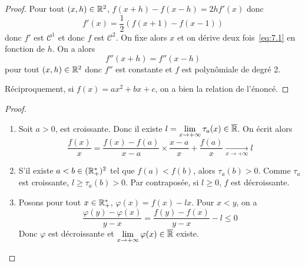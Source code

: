 \begin{proof}
	Pour tout $(x,h)\in\mathbb{R}^{2}$, $f(x+h)-f(x-h)=2hf'(x)$ donc 
	\begin{equation}
		\label{eq:7.1}
		f'(x)=\frac{1}{2}(f(x+1)-f(x-1))
	\end{equation}
	donc $f'$ est $\mathcal{C}^{1}$ et donc $f$ est $\mathcal{C}^{2}$. On fixe alors $x$ et on dérive deux fois~\eqref{eq:7.1} en fonction de $h$. On a alors
	\begin{equation}f''(x+h)=f''(x-h)\end{equation}
	pour tout $(x,h)\in\mathbb{R}^{2}$ donc $f''$ est constante et $f$ est polynômiale de degré 2.

	Réciproquement, si $f(x)=ax^{2}+bx+c$, on a bien la relation de l'énoncé.
\end{proof}

\begin{proof}
	\phantom{}
	\begin{enumerate}
		\item Soit $a>0$, \function{\tau_{a}}{\R}{]a,+\infty[}{x}{\frac{f(x)-f(a)}{x-a}}
		est croissante. Donc il existe $l=\lim\limits_{x\to+\infty}\tau_{a}(x)\in\overline{\mathbb{R}}$. On écrit alors 
		\begin{equation}\frac{f(x)}{x}=\frac{f(x)-f(a)}{x-a}\times \frac{x-a}{x}+\frac{f(a)}{x}\xrightarrow[x\to+\infty]{}l\end{equation}

		\item S'il existe $a<b\in(\mathbb{R}_{+}^{*})^{2}$ tel que $f(a)<f(b)$, alors $\tau_{a}(b)>0$. Comme $\tau_{a}$ est croissante, $l\geqslant\tau_{a}(b)>0$. Par contraposée, si $l\geqslant0$, $f$ est décroissante.
		\item Posons pour tout $x\in\mathbb{R}_{+}^{*}$, $\varphi(x)=f(x)-lx$. Pour $x<y$, on a 
		\begin{equation}\frac{\varphi(y)-\varphi(x)}{y-x}=\frac{f(y)-f(x)}{y-x}-l\leqslant0\end{equation}
		Donc $\varphi$ est décroissante et $\lim\limits_{x\to+\infty}\varphi(x)\in\overline{\mathbb{R}}$ existe.
	\end{enumerate}
\end{proof}

